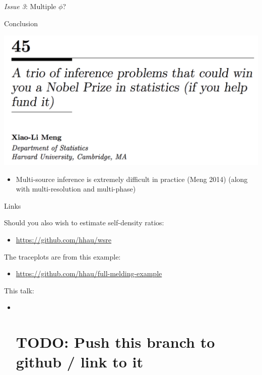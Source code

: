 \documentclass[10pt,ignorenonframetext,]{beamer}
\providecommand{\tightlist}{%
  \setlength{\itemsep}{0pt}\setlength{\parskip}{0pt}}
\begin{document}
\begin{frame}{\emph{Issue 3}: Multiple \(\phi\)?}



\end{frame}

\begin{frame}{Conclusion}

\begin{center}\includegraphics[width=1\linewidth]{figures/a-trio-of-inference-problems} \end{center}

\begin{itemize}
\tightlist
\item
  Multi-source inference is extremely difficult in practice (Meng 2014)
  (along with multi-resolution and multi-phase)
\end{itemize}

\end{frame}

\begin{frame}{Links}

Should you also wish to estimate self-density ratios:

\begin{itemize}
\tightlist
\item
  \url{https://github.com/hhau/wsre}
\end{itemize}

The traceplots are from this example:

\begin{itemize}
\tightlist
\item
  \url{https://github.com/hhau/full-melding-example}
\end{itemize}

This talk:

\begin{itemize}
\item ~
  \section{TODO: Push this branch to github / link to
  it}\label{todo-push-this-branch-to-github-link-to-it}
\end{itemize}

\end{frame}
\end{document}
